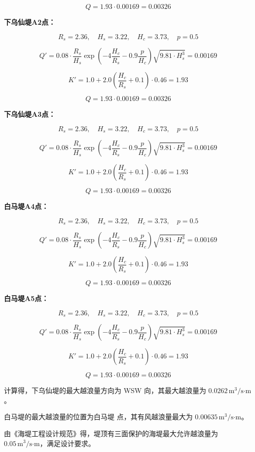 \documentclass[UTF8, a4paper, 12pt]{ctexart} %
\begin{document}
\[
Q = 1.93 \cdot 0.00169 = 0.00326
\]

\textbf{下乌仙堤A2点：}

\[
R_s = 2.36, \quad H_s = 3.22, \quad H_c = 3.73, \quad p = 0.5
\]

\[
Q' = 0.08 \cdot \frac{R_s}{H_s} \exp\left(-4 \frac{H_c}{R_s} - 0.9 \frac{p}{H_c}\right) \sqrt{9.81 \cdot H_s^3} = 0.00169
\]

\[
K' = 1.0 + 2.0 \left(\frac{H_c}{R_s} + 0.1\right) \cdot 0.46 = 1.93
\]

\[
Q = 1.93 \cdot 0.00169 = 0.00326
\]

\textbf{下乌仙堤A3点：}

\[
R_s = 2.36, \quad H_s = 3.22, \quad H_c = 3.73, \quad p = 0.5
\]

\[
Q' = 0.08 \cdot \frac{R_s}{H_s} \exp\left(-4 \frac{H_c}{R_s} - 0.9 \frac{p}{H_c}\right) \sqrt{9.81 \cdot H_s^3} = 0.00169
\]

\[
K' = 1.0 + 2.0 \left(\frac{H_c}{R_s} + 0.1\right) \cdot 0.46 = 1.93
\]

\[
Q = 1.93 \cdot 0.00169 = 0.00326
\]

\textbf{白马堤A4点：}

\[
R_s = 2.36, \quad H_s = 3.22, \quad H_c = 3.73, \quad p = 0.5
\]

\[
Q' = 0.08 \cdot \frac{R_s}{H_s} \exp\left(-4 \frac{H_c}{R_s} - 0.9 \frac{p}{H_c}\right) \sqrt{9.81 \cdot H_s^3} = 0.00169
\]

\[
K' = 1.0 + 2.0 \left(\frac{H_c}{R_s} + 0.1\right) \cdot 0.46 = 1.93
\]

\[
Q = 1.93 \cdot 0.00169 = 0.00326
\]


\textbf{白马堤A5点：}

\[
R_s = 2.36, \quad H_s = 3.22, \quad H_c = 3.73, \quad p = 0.5
\]

\[
Q' = 0.08 \cdot \frac{R_s}{H_s} \exp\left(-4 \frac{H_c}{R_s} - 0.9 \frac{p}{H_c}\right) \sqrt{9.81 \cdot H_s^3} = 0.00169
\]

\[
K' = 1.0 + 2.0 \left(\frac{H_c}{R_s} + 0.1\right) \cdot 0.46 = 1.93
\]

\[
Q = 1.93 \cdot 0.00169 = 0.00326
\]


计算得，下乌仙堤的最大越浪量方向为 WSW 向，其最大越浪量为 $0.0262\,\text{m}^3/\text{s·m}$。

白马堤的最大越浪量的位置为白马堤 点，其有风越浪量最大为 $0.00635\,\text{m}^3/\text{s·m}$。

由《海堤工程设计规范》得，堤顶有三面保护的海堤最大允许越浪量为 $0.05\,\text{m}^3/\text{s·m}$，满足设计要求。
\end{document}
